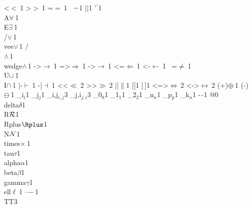 {{{<}{{$<\ $}}1
        {>}{{$>\ $}}1
        {=}{{$=\ $}}1
        {~}{{$\neg\ $}}1
        {|}{{$\mid$}}1
        {'}{{$^\prime$}}1
{\\A}{{$\forall\ $}}1
        {\\E}{{$\exists\ $}}1
        {\\/}{{$\vee\,$}}1
        {\\vee}{{$\vee\,$}}1
        {/\\}{{$\wedge\,$}}1
        {\\wedge}{{$\wedge\,$}}1
        {->}{{$\rightarrow\ $}}1
        {=>}{{$\Rightarrow\ $}}1
        {->}{{$\rightarrow\ $}}1
        {<=}{{$\Leftarrow\ $}}1
        {<-}{{$\leftarrow\ $}}1
{~=}{{$\neq\ $}}1
        {\\U}{{$\cup\ $}}1
        {\\I}{{$\cap\ $}}1
        {|-}{{$\vdash\ $}}1
        {-|}{{$\dashv\ $}}1
        {<<}{{$\ll\ $}}2
        {>>}{{$\gg\ $}}2
        {||}{{$\|$}}1
{[}{{$[$}}1
        {]}{{$\,]$}}1
{<=>}{{$\Leftrightarrow\ $}}2
        {<->}{{$\leftrightarrow\ $}}2
        {(+)}{{$\oplus\ $}}1
        {(-)}{{$\ominus\ $}}1
        {_i}{{$_{i}$}}1
        {_j}{{$_{j}$}}1
        {_{i,j}}{{$_{i,j}$}}3
        {_{j,i}}{{$_{j,i}$}}3
        {_0}{{$_0$}}1
        {_1}{{$_1$}}1
        {_2}{{$_2$}}1
        {_n}{{$_n$}}1
        {_p}{{$_p$}}1
        {_k}{{$_n$}}1
        {-}{{$\ms{-}$}}1
        {@}{{}}0
        {\\delta}{{$\delta$}}1
        {\\R}{{${\mathcal R}$}}1
        {\\Rplus}{{$\Rplus$}}1
        {\\N}{{${\mathcal N}$}}1
        {\\times}{{$\times\ $}}1
        {\\tau}{{$\tau$}}1
        {\\alpha}{{$\alpha$}}1
        {\\beta}{{$\beta$}}1
        {\\gamma}{{$\gamma$}}1
        {\\ell}{{$\ell\ $}}1
        {--}{{$-\ $}}1
        {\\TT}{{\hspace{1.5em}}}3
      }



}
